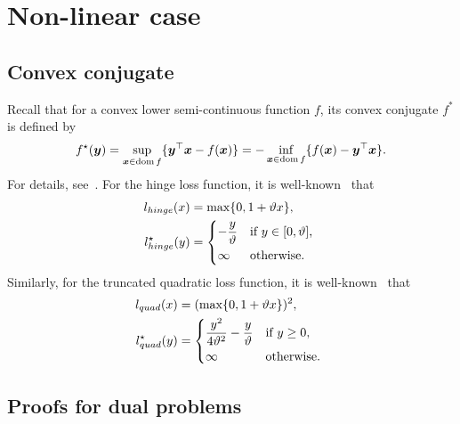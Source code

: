 \chapter{Non-linear case}

\section{Convex conjugate}

Recall that for a convex lower semi-continuous function $f$, its convex conjugate $f^*$ is defined by
\begin{equation*}
  f^{\star} (\bm{y})
  =  \sup_{\bm{x} \in \operatorname*{dom} f} \{\bm{y}^{\top}\bm{x} - f(\bm{x})\}
  = -\inf_{\bm{x} \in \operatorname*{dom} f} \{f(\bm{x}) - \bm{y}^{\top}\bm{x}\}.    
\end{equation*}
For details, see~\cite[page~91]{boyd2004convex}. For the hinge loss function, it is well-known~\cite{shnlev2014accelerated} that 
\begin{equation}\label{eq:Conjugate of hinge loss}
  \begin{aligned}
    l_{hinge}(x) & = \max\{0,1 + \vartheta x\}, \\
    l_{hinge}^{\star}(y) & =
      \begin{dcases*}
        -\frac{y}{\vartheta} & if $y \in [0, \vartheta]$, \\
        \infty & otherwise.
      \end{dcases*}  
  \end{aligned}
\end{equation}
Similarly, for the truncated quadratic loss function, it is well-known~\cite{kanamori2013conjugate} that
\begin{equation}\label{eq:Conjugate of truncated quadratic loss}
  \begin{aligned}
    l_{quad}(x) &= (\max\{0,1 + \vartheta x\} )^2, \\
    l_{quad}^{\star}(y) & =
      \begin{dcases*}
        \frac{y^2}{4\vartheta^2} - \frac{y}{\vartheta} & if $y \geq 0$, \\
        \infty & otherwise. \\
      \end{dcases*}  
  \end{aligned}
\end{equation}

\section{Proofs for dual problems}

